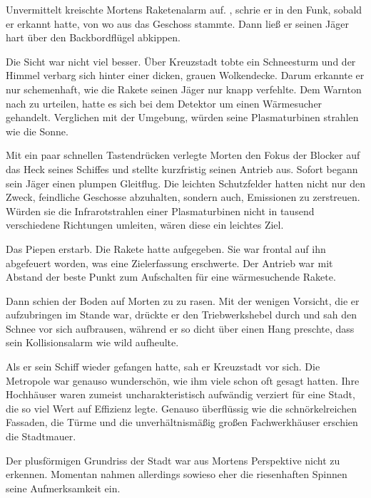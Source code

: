 \par

Unvermittelt kreischte Mortens Raketenalarm auf. , schrie er in den Funk, sobald er erkannt hatte, von wo aus das Geschoss stammte. Dann ließ er seinen Jäger hart über den Backbordflügel abkippen.

\par

Die Sicht war nicht viel besser. Über Kreuzstadt tobte ein Schneesturm und der Himmel verbarg sich hinter einer dicken, grauen Wolkendecke. Darum erkannte er nur schemenhaft, wie die Rakete seinen Jäger nur knapp verfehlte. Dem Warnton nach zu urteilen, hatte es sich bei dem Detektor um einen Wärmesucher gehandelt. Verglichen mit der Umgebung, würden seine Plasmaturbinen strahlen wie die Sonne. 

\par

Mit ein paar schnellen Tastendrücken verlegte Morten den Fokus der Blocker auf das Heck seines Schiffes und stellte kurzfristig seinen Antrieb aus. Sofort begann sein Jäger einen plumpen Gleitflug. Die leichten Schutzfelder hatten nicht nur den Zweck, feindliche Geschosse abzuhalten, sondern auch, Emissionen zu zerstreuen. Würden sie die Infrarotstrahlen einer Plasmaturbinen nicht in tausend verschiedene Richtungen umleiten, wären diese ein leichtes Ziel.

\par

Das Piepen erstarb. Die Rakete hatte aufgegeben. Sie war frontal auf ihn abgefeuert worden, was eine Zielerfassung erschwerte. Der Antrieb war mit Abstand der beste Punkt zum Aufschalten für eine wärmesuchende Rakete.

\par

Dann schien der Boden auf Morten zu zu rasen. Mit der wenigen Vorsicht, die er aufzubringen im Stande war, drückte er den Triebwerkshebel durch und sah den Schnee vor sich aufbrausen, während er so dicht über einen Hang preschte, dass sein Kollisionsalarm wie wild aufheulte.

\par

Als er sein Schiff wieder gefangen hatte, sah er Kreuzstadt vor sich. Die Metropole war genauso wunderschön, wie ihm viele schon oft gesagt hatten. Ihre Hochhäuser waren zumeist uncharakteristisch aufwändig verziert für eine Stadt, die so viel Wert auf Effizienz legte. Genauso überflüssig wie die schnörkelreichen Fassaden, die Türme und die unverhältnismäßig großen Fachwerkhäuser erschien die Stadtmauer.

\par

Der plusförmigen Grundriss der Stadt war aus Mortens Perspektive nicht zu erkennen. Momentan nahmen allerdings sowieso eher die riesenhaften Spinnen seine Aufmerksamkeit ein.